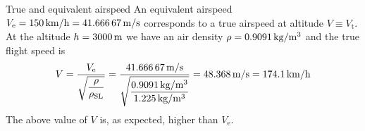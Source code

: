 \documentclass[[12pt,twoside]{book}
\begin{document}
%

%
\begin{myExampleX}{True and equivalent airspeed}{}%
\label{example:Equivalent:Airspeed:Basic:A}
%
\noindent
An equivalent airspeed
$V_\mathrm{e}
 =\SI[round-precision=0]{\myFlightSpeedEASKMH}{km/h}
 =\SI[round-precision=1]{\myFlightSpeedEASMTSec}{m/s}$
corresponds to a true airspeed at altitude $V\equiv V_\mathrm{t}$.
%
At the altitude $h=\SI[round-precision=0]{\myAltitudeMT}{m}$ we have an air density
$\rho=\SI[round-precision=3]{\myAirDensityKGMTcubed}{kg/m^3}$ and the
true flight speed is
\[
V = 
  \frac{ V_\text{e} }{ \sqrt{\dfrac{\rho}{\rho_\mathrm{SL}}} }
  = 
  \frac{
    \SI[round-precision=1]{\myFlightSpeedEASMTSec}{m/s}
  }{
    \sqrt{
      \dfrac{
        \SI[round-precision=3]{\myAirDensityKGMTcubed}{kg/m^3}
      }{
        \SI[round-precision=3]{\myISAAirDensitySeaLevelKGMTcubed}{kg/m^3}
      }
    }
  }
= 
 { \SI[round-precision=1]{\myFlightSpeedMTSec}{\meter/\second} }
  = { \SI[round-precision=1]{\myFlightSpeedKMH}{\kilo\meter/\hour} }
\]
%
The above value of $V$ is, as expected, higher than $V_\mathrm{e}$.

\end{myExampleX}
\end{document}

